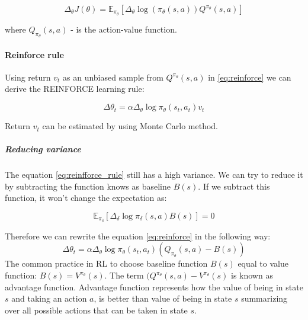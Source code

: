 \begin{equation} \label{eq:reinforce}
	\Delta_{\theta} J(\theta) = \mathbb{E}_{\pi_{\theta}}
		[\Delta_{\theta} \log(
		\pi_{\theta}(s, a) )  Q^{\pi_{\theta}}(s, a)]
\end{equation}

where $Q_{\pi_{\theta}}(s, a)$ - is the action-value function.

\paragraph{Reinforce rule}
Using return $v_t$ as an unbiased sample from $Q^{\pi_{\theta}}(s, a)$
in \ref{eq:reinforce} we can derive the REINFORCE learning rule:

\begin{equation} \label{eq:reinfforce_rule}
	\Delta \theta_t = \alpha \Delta_{\theta} \log \pi_{\theta}(s_t, a_t) v_t
\end{equation}


Return $v_t$ can be estimated by using Monte Carlo method.
\subparagraph{Reducing variance} The equation \ref{eq:reinfforce_rule} still has
a high variance. We can try to reduce it by subtracting the function knows as
baseline $B(s)$. If we subtract this function, it won't change the expectation
as:

\begin{equation} \label{eq:bas_0}
	\mathbb{E}_{\pi_{\delta}} [\Delta_{\delta} \log \pi_{\delta}(s, a) B(s)] = 0
\end{equation}

Therefore we can rewrite the equation \ref{eq:reinforce} in the following
way:
\begin{equation}
	\Delta \theta_t = \alpha \Delta_{\theta} \log \pi_{\theta}(s_t, a_t) (Q_{\pi_{\theta}}(s, a) - B(s))
\end{equation}
The common practice in RL to choose baseline function $B(s)$ equal to value function:
 $B(s) = V^{\pi_{\theta}}(s)$. The term $(Q^{\pi_{\theta}}(s, a) -  V^{\pi_{\theta}}(s)$
 is known as advantage function. Advantage function represents how the value
 of being in state $s$ and taking an action $a$, is better than value of being in state $s$
 summarizing over all possible actions that can be taken in state $s$.
%
%

